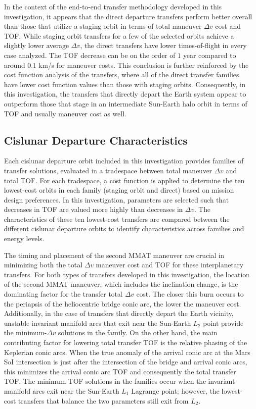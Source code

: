 In the context of the end-to-end transfer methodology developed in this investigation, it appears
that the direct departure transfers perform better overall than those that utilize a staging orbit
in terms of total maneuver $\Delta v$ cost and TOF. While staging orbit transfers for a few of the
selected orbits achieve a slightly lower average $\Delta v$, the direct transfers have lower
times-of-flight in every case analyzed. The TOF decrease can be on the order of $1$ year compared
to around $0.1$ km/s for maneuver costs. This conclusion is further reinforced by the cost function
analysis of the transfers, where all of the direct transfer families have lower cost function
values than those with staging orbits. Consequently, in this investigation, the transfers that
directly depart the Earth system appear to outperform those that stage in an intermediate Sun-Earth
halo orbit in terms of TOF and usually maneuver cost as well.

\subsection{Cislunar Departure Characteristics}
Each cislunar departure orbit included in this investigation provides families of transfer
solutions, evaluated in a tradespace between total maneuver $\Delta v$ and total TOF. For each
tradespace, a cost function is applied to determine the ten lowest-cost orbits in each family
(staging orbit and direct) based on mission design preferences. In this investigation, parameters
are selected such that decreases in TOF are valued more highly than decreases in $\Delta v$. The
characteristics of these ten lowest-cost transfers are compared between the different cislunar
departure orbits to identify characteristics across families and energy levels.

The timing and placement of the second MMAT maneuver are crucial in minimizing both the total
$\Delta v$ maneuver cost and TOF for these interplanetary transfers. For both types of transfers
developed in this investigation, the location of the second MMAT maneuver, which includes the
inclination change, is the dominating factor for the transfer total $\Delta v$ cost. The closer
this burn occurs to the periapsis of the heliocentric bridge conic arc, the lower the maneuver
cost. Additionally, in the case of transfers that directly depart the Earth vicinity, unstable
invariant manifold arcs that exit near the Sun-Earth $L_{2}$ point provide the minimum-$\Delta v$
solutions in the family. On the other hand, the main contributing factor for lowering total
transfer TOF is the relative phasing of the Keplerian conic arcs. When the true anomaly of the
arrival conic arc at the Mars SoI intersection is just after the intersection of the bridge and
arrival conic arcs, this minimizes the arrival conic arc TOF and consequently the total transfer
TOF. The minimum-TOF solutions in the families occur when the invariant manifold arcs exit near the
Sun-Earth $L_{1}$ Lagrange point; however, the lowest-cost transfers that balance the two
parameters still exit from $L_{2}$.

